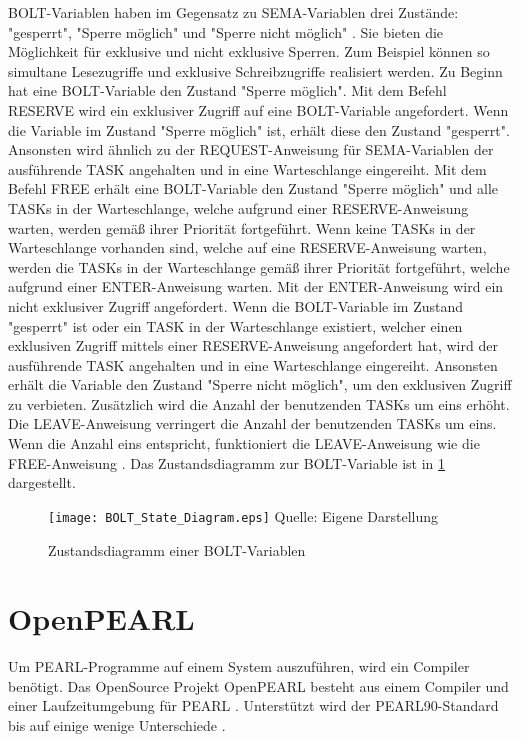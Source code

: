 \textrm{BOLT}-Variablen haben im Gegensatz zu \textrm{SEMA}-Variablen drei
Zustände: "gesperrt", "Sperre möglich" und "Sperre nicht möglich"
\autocite[vgl.][125]{PEARL}. Sie bieten die Möglichkeit für exklusive und nicht
exklusive Sperren. Zum Beispiel können so simultane Lesezugriffe und exklusive
Schreibzugriffe realisiert werden. Zu Beginn hat eine
\textrm{BOLT}-Variable den Zustand "Sperre möglich". Mit dem Befehl \textrm{RESERVE}
wird ein exklusiver Zugriff auf eine \textrm{BOLT}-Variable angefordert. Wenn
die Variable im Zustand "Sperre möglich" ist, erhält diese den Zustand
"gesperrt". Ansonsten wird ähnlich zu der \textrm{REQUEST}-Anweisung für
\textrm{SEMA}-Variablen der ausführende \textrm{TASK} angehalten und in eine
Warteschlange eingereiht. Mit dem Befehl \textrm{FREE} erhält eine
\textrm{BOLT}-Variable den Zustand "Sperre möglich" und alle \textrm{TASKs} in
der Warteschlange, welche aufgrund einer \textrm{RESERVE}-Anweisung warten,
werden gemäß ihrer Priorität fortgeführt. Wenn keine \textrm{TASKs} in der
Warteschlange vorhanden sind, welche auf eine \textrm{RESERVE}-Anweisung warten,
werden die \textrm{TASKs} in der Warteschlange gemäß ihrer Priorität
fortgeführt, welche aufgrund einer \textrm{ENTER}-Anweisung warten. Mit der
\textrm{ENTER}-Anweisung wird ein nicht exklusiver Zugriff angefordert. Wenn die
\textrm{BOLT}-Variable im Zustand "gesperrt" ist oder ein \textrm{TASK} in der
Warteschlange existiert, welcher einen exklusiven Zugriff mittels einer
\textrm{RESERVE}-Anweisung angefordert hat, wird der ausführende \textrm{TASK}
angehalten und in eine Warteschlange eingereiht. Ansonsten erhält die Variable
den Zustand "Sperre nicht möglich", um den exklusiven Zugriff zu verbieten.
Zusätzlich wird die Anzahl der benutzenden \textrm{TASKs} um eins erhöht. Die
\textrm{LEAVE}-Anweisung verringert die Anzahl der benutzenden \textrm{TASKs} um
eins. Wenn die Anzahl eins entspricht, funktioniert die \textrm{LEAVE}-Anweisung
wie die \textrm{FREE}-Anweisung \autocite[vgl.][125-127]{PEARL}. Das
Zustandsdiagramm zur \textrm{BOLT}-Variable ist in \cref{fig:BOLT_StateDiagram}
dargestellt.
\begin{figure}[ht]
  \texttt{[image: BOLT\_State\_Diagram.eps]}
  \footnotesize\sffamily Quelle: Eigene Darstellung
  \caption{Zustandsdiagramm einer BOLT-Variablen}
  \label{fig:BOLT_StateDiagram}
\end{figure}

\section{OpenPEARL}
\label{section:OpenPEARL}
Um PEARL-Programme auf einem System auszuführen, wird ein Compiler benötigt. Das
OpenSource Projekt OpenPEARL besteht aus einem Compiler und einer
Laufzeitumgebung für PEARL \autocite{OpenPEARL_Structure}. Unterstützt wird der
PEARL90-Standard bis auf einige wenige Unterschiede
\autocite{OpenPEARL_Differences_To_PEARL90}.

